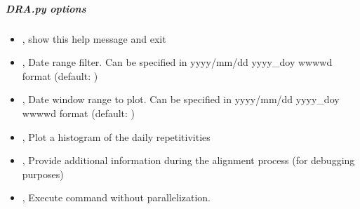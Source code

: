 \documentclass[letterpaper,10pt,english]{sphinxmanual}
\begin{document}
\subparagraph{DRA.py options}
\label{\detokenize{pgamit.com:DRA.py-options}}\begin{itemize}
\item {} 
\sphinxAtStartPar
{\hyperref[\detokenize{pgamit.com:DRA.py--h}]{}}, {\hyperref[\detokenize{pgamit.com:DRA.py---help}]{}} \sphinxhyphen{} show this help message and exit

\item {} 
\sphinxAtStartPar
{\hyperref[\detokenize{pgamit.com:DRA.py--d}]{}} , {\hyperref[\detokenize{pgamit.com:DRA.py---date_filter}]{}}  \sphinxhyphen{} Date range filter. Can be specified in yyyy/mm/dd yyyy\_doy  wwww\sphinxhyphen{}d format (default: )

\item {} 
\sphinxAtStartPar
{\hyperref[\detokenize{pgamit.com:DRA.py--w}]{}} , {\hyperref[\detokenize{pgamit.com:DRA.py---plot_window}]{}}  \sphinxhyphen{} Date window range to plot. Can be specified in yyyy/mm/dd yyyy\_doy  wwww\sphinxhyphen{}d format (default: )

\item {} 
\sphinxAtStartPar
{\hyperref[\detokenize{pgamit.com:DRA.py--hist}]{}}, {\hyperref[\detokenize{pgamit.com:DRA.py---histogram}]{}} \sphinxhyphen{} Plot a histogram of the daily repetitivities

\item {} 
\sphinxAtStartPar
{\hyperref[\detokenize{pgamit.com:DRA.py--v}]{}}, {\hyperref[\detokenize{pgamit.com:DRA.py---verbose}]{}} \sphinxhyphen{} Provide additional information during the alignment process (for debugging purposes)

\item {} 
\sphinxAtStartPar
{\hyperref[\detokenize{pgamit.com:DRA.py--np}]{}}, {\hyperref[\detokenize{pgamit.com:DRA.py---noparallel}]{}} \sphinxhyphen{} Execute command without parallelization.

\end{itemize}
\end{document}
